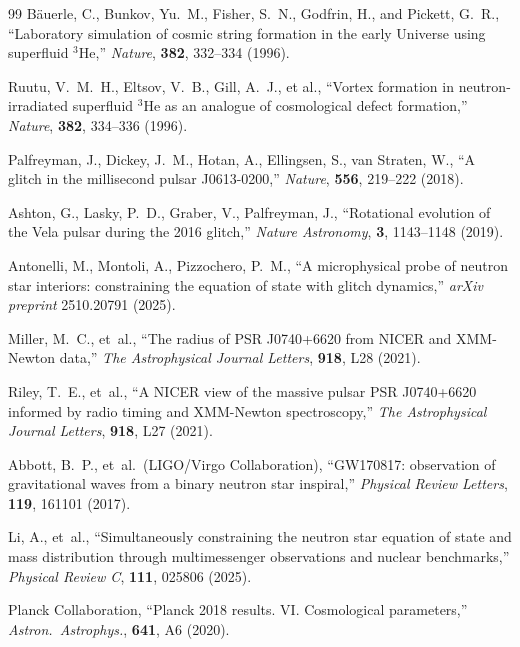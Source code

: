 ﻿\documentclass[12pt,letterpaper]{article}
\begin{document}
\begin{thebibliography}{99}
B\"auerle, C., Bunkov, Yu.~M., Fisher, S.~N., Godfrin, H., and Pickett, G.~R.,
``Laboratory simulation of cosmic string formation in the early Universe using superfluid $^3$He,''
\textit{Nature}, \textbf{382}, 332--334 (1996).


Ruutu, V.~M.~H., Eltsov, V.~B., Gill, A.~J., et al.,
``Vortex formation in neutron-irradiated superfluid $^3$He as an analogue of cosmological defect formation,''
\textit{Nature}, \textbf{382}, 334--336 (1996).


  Palfreyman, J., Dickey, J.~M., Hotan, A., Ellingsen, S., van Straten, W.,
  ``A glitch in the millisecond pulsar J0613-0200,''
  \textit{Nature}, \textbf{556}, 219--222 (2018).


  Ashton, G., Lasky, P.~D., Graber, V., Palfreyman, J.,
  ``Rotational evolution of the Vela pulsar during the 2016 glitch,''
  \textit{Nature Astronomy}, \textbf{3}, 1143--1148 (2019).


  Antonelli, M., Montoli, A., Pizzochero, P.~M.,
  ``A microphysical probe of neutron star interiors:
  constraining the equation of state with glitch dynamics,''
  \textit{arXiv preprint} 2510.20791 (2025).


  Miller, M.~C., et~al.,
  ``The radius of PSR J0740+6620 from NICER and XMM-Newton data,''
  \textit{The Astrophysical Journal Letters}, \textbf{918}, L28 (2021).


  Riley, T.~E., et~al.,
  ``A NICER view of the massive pulsar PSR J0740+6620
  informed by radio timing and XMM-Newton spectroscopy,''
  \textit{The Astrophysical Journal Letters}, \textbf{918}, L27 (2021).


  Abbott, B.~P., et~al.\ (LIGO/Virgo Collaboration),
  ``GW170817: observation of gravitational waves from a
  binary neutron star inspiral,''
  \textit{Physical Review Letters}, \textbf{119}, 161101 (2017).


  Li, A., et~al.,
  ``Simultaneously constraining the neutron star equation of state
  and mass distribution through multimessenger observations
  and nuclear benchmarks,''
  \textit{Physical Review C}, \textbf{111}, 025806 (2025).



Planck Collaboration,
``Planck 2018 results. VI. Cosmological parameters,''
\textit{Astron.\ Astrophys.}, \textbf{641}, A6 (2020).



\end{thebibliography}
\end{document}
